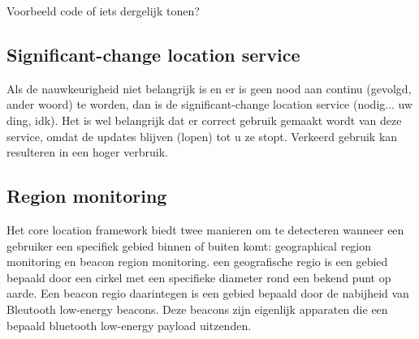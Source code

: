 Voorbeeld code of iets dergelijk tonen?




\subsection{Significant-change location service}
\label{subsec: significantchangelocService}
Als de nauwkeurigheid niet belangrijk is en er is geen nood aan continu (gevolgd, ander woord) te worden, dan is de significant-change location service (nodig... uw ding, idk). Het is wel belangrijk dat er correct gebruik gemaakt wordt van deze service, omdat de updates blijven (lopen) tot u ze stopt. Verkeerd gebruik kan resulteren in een hoger verbruik. 


\iffalse
If you leave the significant-change location service running and your iOS app is subsequently suspended or terminated, the service automatically wakes up your app when new location data arrives. 

At wake-up time, the app is put into the background and you are given a small amount of time (around 10 seconds) to manually restart location services and process the location data. (You must manually restart location services in the background before any pending location updates can be delivered, as described in Knowing When to Start Location Services.) Because your app is in the background, it must do minimal work and avoid any tasks (such as querying the network) that might prevent it from returning before the allocated time expires. 

If it does not, your app will be terminated. If an iOS app needs more time to process the location data, it can request more background execution time using the beginBackgroundTaskWithName:expirationHandler: method of the UIApplication class.
\fi


\subsection{Region monitoring}
\label{subsec: regionmonitoring}
Het core location framework biedt twee manieren om te detecteren wanneer een gebruiker een specifiek gebied binnen of buiten komt: geographical region monitoring en beacon region monitoring. een geografische regio is een gebied bepaald door een cirkel met een specifieke diameter rond een bekend punt op aarde. Een beacon regio daarintegen is een gebied bepaald door de nabijheid van  Bleutooth low-energy beacons. Deze beacons zijn eigenlijk apparaten die een bepaald bluetooth low-energy payload uitzenden.

